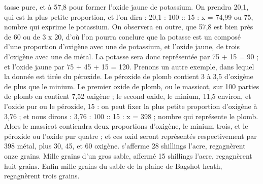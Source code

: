 \setcounter{page}{450} tasse pure, et à 57,8 pour former l'oxide jaune de potassium. On prendra 20,1, qui est la plus petite proportion, et l'on dira : 20,1 : 100 :: 15 : x = 74,99 ou 75, nombre qui exprime le potassium. On observera en outre, que 57,8 est bien près de 60 ou de 3 x 20, d'où l'on pourra conclure que la potasse est un composé d'une proportion d'oxigène avec une de potassium, et l'oxide jaune, de trois d'oxigène avec une de métal. La potasse sera donc représentée par 75 + 15 = 90 ; et l'oxide jaune par 75 + 45 + 15 = 120. Prenons un autre exemple, dans lequel la donnée est tirée du péroxide. Le péroxide de plomb contient 3 à 3,5 d'oxigène de plus que le minium. Le premier oxide de plomb, ou le massicot, sur 100 parties de plomb en contient 7,52 oxigène ; le second oxide, le minium, 11,5 environ, et l'oxide pur ou le péroxide, 15 : on peut fixer la plus petite proportion d'oxigène à 3,76 ; et nous dirons : 3,76 : 100 :: 15 : x = 398 ; nombre qui représente le plomb. Alors le massicot contiendra deux proportions d'oxigène, le minium trois, et le péroxide ou l'oxide pur quatre ; et ces oxid seront représentés respectivement par 398 métal, plus 30, 45, et 60 oxigène.\setcounter{page}{451} s'afferme 28 shillings l'acre, regagnèrent onze grains.
Mille grains d'un gros sable, affermé 15 shillings l'acre, regagnèrent huit grains.
Enfin mille grains du sable de la plaine de Bagshot heath, regagnèrent trois grains.
